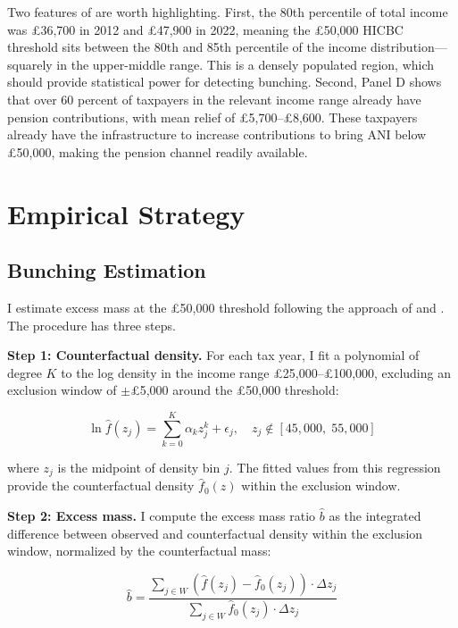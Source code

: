 \documentclass[12pt]{article}
\newcommand{\bhat}{\hat{b}}
\begin{document}
Two features of  are worth highlighting. First, the 80th percentile of total income was \pounds36,700 in 2012 and \pounds47,900 in 2022, meaning the \pounds50,000 HICBC threshold sits between the 80th and 85th percentile of the income distribution---squarely in the upper-middle range. This is a densely populated region, which should provide statistical power for detecting bunching. Second, Panel D shows that over 60 percent of taxpayers in the relevant income range already have pension contributions, with mean relief of \pounds5,700--\pounds8,600. These taxpayers already have the infrastructure to increase contributions to bring ANI below \pounds50,000, making the pension channel readily available.


\section{Empirical Strategy}
\label{sec:empirical}

\subsection{Bunching Estimation}

I estimate excess mass at the \pounds50,000 threshold following the approach of \citet{kleven2013} and \citet{kleven2016}. The procedure has three steps.

\textbf{Step 1: Counterfactual density.} For each tax year, I fit a polynomial of degree $K$ to the log density in the income range \pounds25,000--\pounds100,000, excluding an exclusion window of $\pm$\pounds5,000 around the \pounds50,000 threshold:

\begin{equation}
    \ln \hat{f}(z_j) = \sum_{k=0}^{K} \alpha_k z_j^k + \epsilon_j, \quad z_j \notin [45{,}000, \; 55{,}000]
    \label{eq:counterfactual}
\end{equation}

\noindent where $z_j$ is the midpoint of density bin $j$. The fitted values from this regression provide the counterfactual density $\hat{f}_0(z)$ within the exclusion window.

\textbf{Step 2: Excess mass.} I compute the excess mass ratio $\bhat$ as the integrated difference between observed and counterfactual density within the exclusion window, normalized by the counterfactual mass:

\begin{equation}
    \bhat = \frac{\sum_{j \in W} (\hat{f}(z_j) - \hat{f}_0(z_j)) \cdot \Delta z_j}{\sum_{j \in W} \hat{f}_0(z_j) \cdot \Delta z_j}
    \label{eq:excess_mass}
\end{equation}
\end{document}
